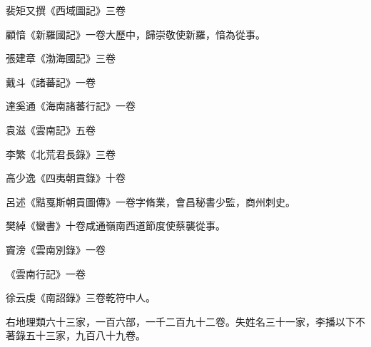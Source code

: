 \begin{pinyinscope}
 裴矩又撰《西域圖記》三卷



 顧愔《新羅國記》一卷大歷中，歸崇敬使新羅，愔為從事。



 張建章《渤海國記》三卷



 戴斗《諸蕃記》一卷



 達奚通《海南諸蕃行記》一卷



 袁滋《雲南記》五卷



 李繁《北荒君長錄》三卷



 高少逸《四夷朝貢錄》十卷



 呂述《黠戛斯朝貢圖傳》一卷字脩業，會昌秘書少監，商州刺史。



 樊綽《蠻書》十卷咸通嶺南西道節度使蔡襲從事。



 竇滂《雲南別錄》一卷



 《雲南行記》一卷



 徐云虔《南詔錄》三卷乾符中人。



 右地理類六十三家，一百六部，一千二百九十二卷。失姓名三十一家，李播以下不著錄五十三家，九百八十九卷。



\end{pinyinscope}